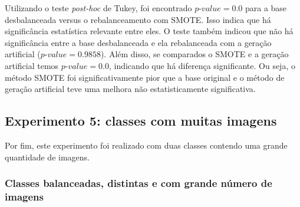 
Utilizando o teste \textit{post-hoc} de Tukey, foi encontrado $\textit{p-value} = 0.0$ para a base desbalanceada versus o rebalanceamento com SMOTE. Isso indica que há significância estatística relevante entre eles. O teste também indicou que não há significância entre a base desbalanceada e ela rebalanceada com a geração artificial ($\textit{p-value} = 0.9858$). Além disso, se comparados o SMOTE e a geração artificial temos $\textit{p-value} = 0.0$, indicando que há diferença significante. Ou seja, o método SMOTE foi significativamente pior que a base original e o método de geração artificial teve uma melhora não estatisticamente significativa.

\subsection{Experimento 5: classes com muitas imagens}

Por fim, este experimento foi realizado com duas classes contendo uma grande quantidade de imagens.

\subsubsection{Classes balanceadas, distintas e com grande número de imagens}


